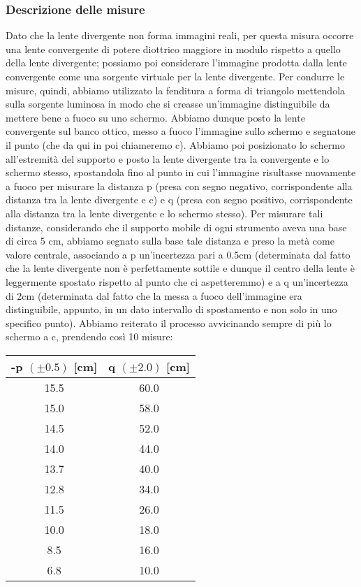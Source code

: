 \documentclass{article}
\begin{document}
\subsubsection{Descrizione delle misure} %
Dato che la lente divergente non forma immagini reali, per questa misura occorre una lente convergente di potere diottrico maggiore in modulo rispetto a
quello della lente divergente; possiamo poi considerare l’immagine prodotta dalla lente
convergente come una sorgente virtuale per la lente divergente.
Per condurre le misure, quindi, abbiamo utilizzato la fenditura a forma di triangolo mettendola sulla sorgente luminosa in modo che si creasse un'immagine distinguibile da mettere bene a fuoco su uno schermo. Abbiamo dunque posto la lente convergente sul banco ottico, messo a fuoco l’immagine sullo schermo e segnatone il punto (che da qui in poi chiameremo c). Abbiamo poi posizionato lo schermo all'estremità del supporto e posto la lente divergente tra la convergente e lo schermo stesso, spostandola fino al punto in cui l'immagine risultasse nuovamente a fuoco per misurare la distanza p (presa con segno negativo, corrispondente alla distanza tra la lente divergente e c) e q (presa con segno positivo, corrispondente alla distanza tra la lente divergente e lo schermo stesso). Per misurare tali distanze, considerando che il supporto mobile di ogni strumento aveva una base di circa 5 cm, abbiamo segnato sulla base tale distanza e preso la metà come valore centrale, associando a p un'incertezza pari a 0.5cm (determinata dal fatto che la lente divergente non è perfettamente sottile e dunque il centro della lente è leggermente spostato rispetto al punto che ci aspetteremmo) e a q un'incertezza di 2cm (determinata dal fatto che la messa a fuoco dell'immagine era distinguibile, appunto, in un dato intervallo di spostamento e non solo in uno specifico punto). Abbiamo reiterato il processo avvicinando sempre di più lo schermo a c, prendendo così 10 misure:

\begin{center}
\begin{tabular}{c|c}
    \toprule
    -p $(\pm 0.5)$ [cm] & q $(\pm 2.0)$ [cm] \\
    \midrule
     15.5 & 60.0 \\
     \midrule
     15.0 & 58.0 \\
     \midrule
     14.5 & 52.0 \\
     \midrule
     14.0 & 44.0 \\
     \midrule
     13.7 & 40.0 \\
     \midrule
     12.8 & 34.0\\
     \midrule
     11.5 & 26.0 \\
     \midrule
     10.0 & 18.0 \\
     \midrule
     8.5 & 16.0 \\
     \midrule
     6.8 & 10.0 \\
     \bottomrule
\end{tabular}
\end{center}
\end{document}
